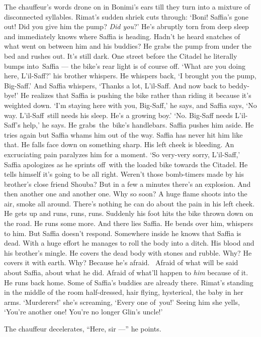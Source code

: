 \documentclass[twoside,11pt]{book}
\begin{document}
The chauffeur's words drone on in Bonimi's ears till they turn into a mixture of disconnected syllables. Rimat's sudden
shriek cuts through:  `Boni! Saffia's gone out! Did you give him the pump? \textit{Did you}?' He's abruptly torn
from deep sleep and immediately knows where Saffia is heading. Hadn't he heard snatches of what went on between him
and his buddies? He grabs the pump from under the bed and rushes out. It's still dark. One street before the Citadel he
literally bumps into~Saffia ---  the bike's rear light is of course off. `What are you doing here, L'il-Saff?' his
brother whispers. He whispers back, `I brought you the pump, Big-Saff.' And Saffia whispers, `Thanks a lot, L'il-Saff.
And now back to beddy-bye!'  He realizes that Saffia is pushing the bike rather than riding it because it's weighted
down. `I'm staying here with you, Big-Saff,' he says, and Saffia says, `No way. L'il-Saff~still needs his sleep. He's
a growing boy.'  `No. Big-Saff needs L'il-Saff's help,' he says. He grabs~the~bike's handlebars. Saffia pushes him
aside. He tries again but Saffia whams him out of the way. Saffia has never hit him like that. He falls face down on
something sharp. His left cheek{ }is bleeding. An excruciating pain paralyzes him for a moment. `So
very-very sorry, L'il-Saff,' Saffia apologizes as he sprints off~with the loaded bike towards the Citadel. He tells
himself it's going to be all right. Weren't those bomb-timers made by his brother's close friend Shouba? But in a few a
minutes there's an explosion. And then another one and another one. Why so soon? A huge flame shoots into the air,
smoke all around. There's nothing he can do about the pain in his left cheek. He gets up and runs, runs, runs. Suddenly
his foot hits the bike thrown down on the road. He runs some more. And there lies Saffia. He bends over him, whispers
to him. But Saffia doesn't respond. Somewhere inside he knows that Saffia is dead. With a huge effort he manages to
roll the body into a ditch. His blood and his brother's mingle{. }He covers the dead body with stones
and rubble. Why? He covers it with earth. Why? Because he's afraid. ~Afraid of what will be said about Saffia, about
what he did. Afraid of what'll happen to \textit{him} because of it. He runs back home. Some of Saffia's buddies are
already there. Rimat's standing in the middle of the room half-dressed, hair flying, hysterical, the baby in her arms.
`Murderers!{}' she's screaming, `Every one of~you!'  Seeing him she yells, `You're another one! You're no
longer Glin's uncle!'

The chauffeur decelerates, ``Here, sir ---'' he points.
\end{document}
